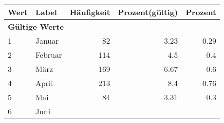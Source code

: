      \begin{longtable}{lXrrr}
     \toprule
     \textbf{Wert} & \textbf{Label} & \textbf{Häufigkeit} & \textbf{Prozent(gültig)} & \textbf{Prozent} \\
     \endhead
     \midrule
     \multicolumn{5}{l}{\textbf{Gültige Werte}}\\

     1 &
     \multicolumn{1}{X}{ Januar   } &


       \num{82} &
       \num[round-mode=places,round-precision=2]{3,23} &
         \num[round-mode=places,round-precision=2]{0,29} \\

     2 &
     \multicolumn{1}{X}{ Februar   } &


       \num{114} &
       \num[round-mode=places,round-precision=2]{4,5} &
         \num[round-mode=places,round-precision=2]{0,4} \\

     3 &
     \multicolumn{1}{X}{ März   } &


       \num{169} &
       \num[round-mode=places,round-precision=2]{6,67} &
         \num[round-mode=places,round-precision=2]{0,6} \\

     4 &
     \multicolumn{1}{X}{ April   } &


       \num{213} &
       \num[round-mode=places,round-precision=2]{8,4} &
         \num[round-mode=places,round-precision=2]{0,76} \\

     5 &
     \multicolumn{1}{X}{ Mai   } &


       \num{84} &
       \num[round-mode=places,round-precision=2]{3,31} &
         \num[round-mode=places,round-precision=2]{0,3} \\

     6 &
     \multicolumn{1}{X}{ Juni   } &



\end{longtable}
